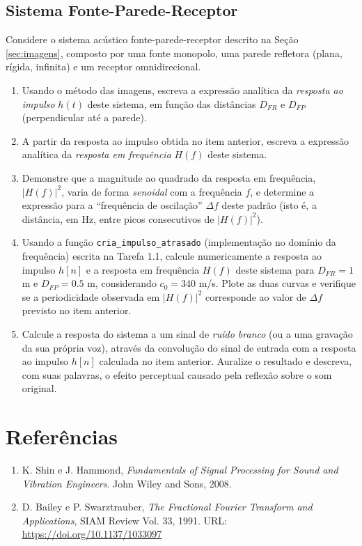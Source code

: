 \documentclass[a4paper,twoside,12pt]{article}
\begin{document}
	\subsection{Sistema Fonte-Parede-Receptor}
	\label{sec:tarefas2}
	
	Considere o sistema acústico fonte-parede-receptor descrito na Seção \ref{sec:imagens}, composto por uma fonte monopolo, uma parede refletora (plana, rígida, infinita) e um receptor omnidirecional.
	
	\begin{enumerate}
		\item Usando o método das imagens, escreva a expressão analítica da \emph{resposta ao impulso} $h(t)$ deste sistema, em função das distâncias $D_{FR}$ e $D_{FP}$ (perpendicular até a parede).
		
		\item A partir da resposta ao impulso obtida no item anterior, escreva a expressão analítica da \emph{resposta em frequência} $H(f)$ deste sistema.
		
		\item Demonstre que a magnitude ao quadrado da resposta em frequência, $|H(f)|^2$, varia de forma \emph{senoidal} com a frequência $f$, e determine a expressão para a ``frequência de oscilação'' $\Delta f$ deste padrão (isto é, a distância, em Hz, entre picos consecutivos de $|H(f)|^2$).
		
		\item Usando a função \texttt{cria\_impulso\_atrasado} (implementação no domínio da frequência) escrita na Tarefa 1.1, calcule numericamente a resposta ao impulso $h[n]$ e a resposta em frequência $H(f)$ deste sistema para $D_{FR} = 1$ m e $D_{FP} = 0.5$ m, considerando $c_0 = 340$ m/s. Plote as duas curvas e verifique se a periodicidade observada em $|H(f)|^2$ corresponde ao valor de $\Delta f$ previsto no item anterior.
		
		\item Calcule a resposta do sistema a um sinal de \emph{ruído branco} (ou a uma gravação da sua própria voz), através da convolução do sinal de entrada com a resposta ao impulso $h[n]$ calculada no item anterior. Auralize o resultado e descreva, com suas palavras, o efeito perceptual causado pela reflexão sobre o som original.
	\end{enumerate}
	
	\section*{Referências}
	
	\begin{enumerate}
		\item K. Shin e J. Hammond, \textit{Fundamentals of Signal Processing for Sound and Vibration Engineers}. John Wiley and Sons, 2008.
		\item D. Bailey e P. Swarztrauber, \textit{The Fractional Fourier Transform and Applications}, SIAM Review
		Vol. 33, 1991. URL: \url{https://doi.org/10.1137/1033097}
	\end{enumerate}
	
\end{document}
